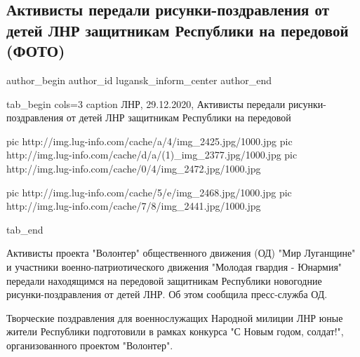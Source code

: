  
 
 
 
 
 
\subsection{Активисты передали рисунки-поздравления от детей ЛНР защитникам Республики на передовой (ФОТО)}
\label{sec:29_12_2020.news.lnr.lug_info.lugansk_inform_center.1.aktivisty_deti}
\ifcmt
	author_begin
   author_id lugansk_inform_center
	author_end
\fi

\ifcmt
tab_begin cols=3
	caption ЛНР, 29.12.2020, Активисты передали рисунки-поздравления от детей ЛНР защитникам Республики на передовой

  pic http://img.lug-info.com/cache/a/4/img_2425.jpg/1000.jpg
	pic http://img.lug-info.com/cache/d/a/(1)_img_2377.jpg/1000.jpg
	pic http://img.lug-info.com/cache/0/4/img_2472.jpg/1000.jpg

	pic http://img.lug-info.com/cache/5/e/img_2468.jpg/1000.jpg
	pic http://img.lug-info.com/cache/7/8/img_2441.jpg/1000.jpg

tab_end
\fi


Активисты проекта "Волонтер" общественного движения (ОД) "Мир Луганщине" и
участники военно-патриотического движения "Молодая гвардия - Юнармия" передали
находящимся на передовой защитникам Республики новогодние рисунки-поздравления
от детей ЛНР. Об этом сообщила пресс-служба ОД.  

Творческие поздравления для военнослужащих Народной милиции ЛНР юные жители
Республики подготовили в рамках конкурса "С Новым годом, солдат!",
организованного проектом "Волонтер".  

